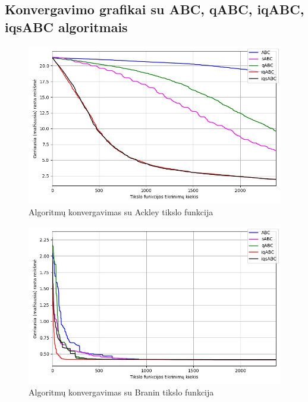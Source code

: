 \documentclass{VUMIFPSmagistrinis}
\begin{document}
\begin{landscape}

\section{Konvergavimo grafikai su ABC, qABC, iqABC, iqsABC algoritmais}\label{PR3all}

\begin{multicols}{2}

\begin{figure}[H]
    \centering
    \includegraphics[scale=0.45]{img/2kv/all_ackley.jpg}
    \caption{Algoritmų konvergavimas su Ackley tikslo funkcija}
    \label{img:kon1}
\end{figure}

\begin{figure}[H]
    \centering
    \includegraphics[scale=0.45]{img/2kv/all_branin.jpg}
     \caption{Algoritmų konvergavimas su Branin tikslo funkcija}
    \label{img:kon2}
\end{figure}


\end{multicols}
\end{landscape}
\end{document}

